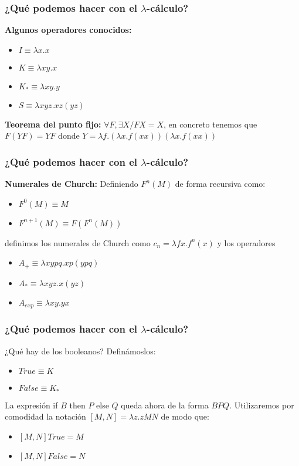 \documentclass[spanish, a4paper, 12pt, final, slideColor, nototal, colorBG, pdf, noaccumulate, darkblue] {beamer}
\begin{document}
\begin{frame}
    \frametitle{¿Qué podemos hacer con el $\lambda$-cálculo?}
    \textbf{Algunos operadores conocidos:}
    \begin{itemize}
        \item $I \equiv \lambda x.x$
        \item $K \equiv \lambda xy.x$
        \item $K_* \equiv \lambda xy.y$
        \item $S \equiv \lambda xyz.xz(yz)$
    \end{itemize}
    \textbf{Teorema del punto fijo: }$\forall F, \exists X / FX = X$, en concreto tenemos que $F(YF) = YF$ donde $Y = \lambda f.(\lambda x.f(xx))(\lambda x.f(xx))$
\end{frame}
\begin{frame}
    \frametitle{¿Qué podemos hacer con el $\lambda$-cálculo?}
    \textbf{Numerales de Church:}
    Definiendo $F^n(M)$ de forma recursiva como:
    \begin{itemize}
        \item $F^0(M) \equiv M$
        \item $F^{n+1}(M) \equiv F(F^n(M))$
    \end{itemize}
    definimos los numerales de Church como $c_n = \lambda fx.f^n(x)$ y los operadores
    \begin{itemize}
        \item $A_+ \equiv \lambda xypq.xp(ypq)$
        \item $A_* \equiv \lambda xyz.x(yz)$
        \item $A_{exp} \equiv \lambda xy.yx$
    \end{itemize}
\end{frame}
\begin{frame}
    \frametitle{¿Qué podemos hacer con el $\lambda$-cálculo?}
    ¿Qué hay de los booleanos? Definámoslos:
    \begin{itemize}
        \item $True \equiv K$
        \item $False \equiv K_*$
    \end{itemize}
    La expresión if $B$ then $P$ else $Q$ queda ahora de la forma $BPQ$.
    Utilizaremos por comodidad la notación $[M,N] = \lambda z.zMN$ de modo que:
    \begin{itemize}
        \item $[M,N]True = M$
        \item $[M,N]False = N$
    \end{itemize}
\end{frame}
\end{document}
